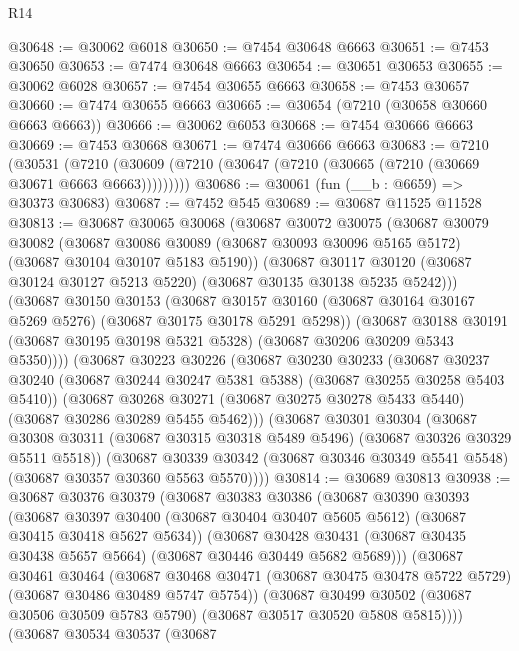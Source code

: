 \begin{lexlean}{R14}
\begin{coremodule}
@30648 := @30062 @6018
@30650 := @7454 @30648 @6663
@30651 := @7453 @30650
@30653 := @7474 @30648 @6663
@30654 := @30651 @30653
@30655 := @30062 @6028
@30657 := @7454 @30655 @6663
@30658 := @7453 @30657
@30660 := @7474 @30655 @6663
@30665 := @30654 (@7210 (@30658 @30660 @6663 @6663))
@30666 := @30062 @6053
@30668 := @7454 @30666 @6663
@30669 := @7453 @30668
@30671 := @7474 @30666 @6663
@30683 := @7210
    (@30531 (@7210 (@30609 (@7210 (@30647 (@7210 (@30665 (@7210 (@30669 @30671 @6663 @6663)))))))))
@30686 := @30061 (fun (__b : @6659) => @30373 @30683)
@30687 := @7452 @545
@30689 := @30687 @11525 @11528
@30813 := @30687
    @30065
    @30068
    (@30687
      @30072
      @30075
      (@30687
        @30079
        @30082
        (@30687 @30086 @30089 (@30687 @30093 @30096 @5165 @5172) (@30687 @30104 @30107 @5183 @5190))
        (@30687
          @30117
          @30120
          (@30687 @30124 @30127 @5213 @5220)
          (@30687 @30135 @30138 @5235 @5242)))
      (@30687
        @30150
        @30153
        (@30687 @30157 @30160 (@30687 @30164 @30167 @5269 @5276) (@30687 @30175 @30178 @5291 @5298))
        (@30687
          @30188
          @30191
          (@30687 @30195 @30198 @5321 @5328)
          (@30687 @30206 @30209 @5343 @5350))))
    (@30687
      @30223
      @30226
      (@30687
        @30230
        @30233
        (@30687 @30237 @30240 (@30687 @30244 @30247 @5381 @5388) (@30687 @30255 @30258 @5403 @5410))
        (@30687
          @30268
          @30271
          (@30687 @30275 @30278 @5433 @5440)
          (@30687 @30286 @30289 @5455 @5462)))
      (@30687
        @30301
        @30304
        (@30687 @30308 @30311 (@30687 @30315 @30318 @5489 @5496) (@30687 @30326 @30329 @5511 @5518))
        (@30687
          @30339
          @30342
          (@30687 @30346 @30349 @5541 @5548)
          (@30687 @30357 @30360 @5563 @5570))))
@30814 := @30689 @30813
@30938 := @30687
    @30376
    @30379
    (@30687
      @30383
      @30386
      (@30687
        @30390
        @30393
        (@30687 @30397 @30400 (@30687 @30404 @30407 @5605 @5612) (@30687 @30415 @30418 @5627 @5634))
        (@30687
          @30428
          @30431
          (@30687 @30435 @30438 @5657 @5664)
          (@30687 @30446 @30449 @5682 @5689)))
      (@30687
        @30461
        @30464
        (@30687 @30468 @30471 (@30687 @30475 @30478 @5722 @5729) (@30687 @30486 @30489 @5747 @5754))
        (@30687
          @30499
          @30502
          (@30687 @30506 @30509 @5783 @5790)
          (@30687 @30517 @30520 @5808 @5815))))
    (@30687
      @30534
      @30537
      (@30687

\end{coremodule}
\end{lexlean}
